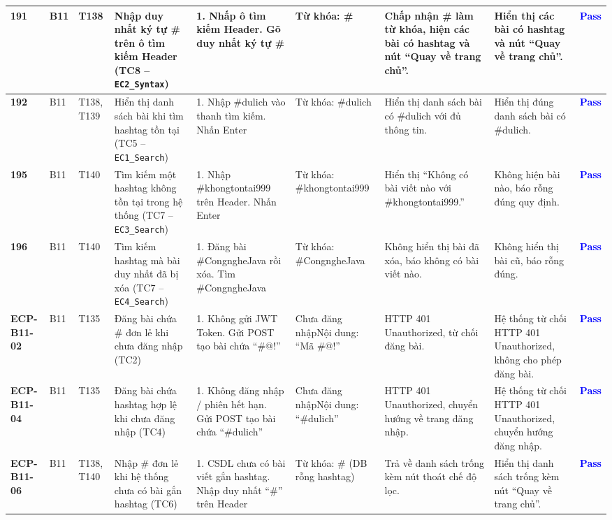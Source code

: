 \documentclass[11pt,a4paper]{article}
\begin{document}
\begin{longtable}{|C{0.9cm}|C{0.7cm}|C{0.9cm}|L{2.0cm}|L{3.0cm}|L{2.25cm}|L{2.6cm}|L{2.5cm}|C{0.85cm}|}
\textbf{191} & B11 & T138 & Nhập duy nhất ký tự \# trên ô tìm kiếm Header (TC8 -- \texttt{EC2\_Syntax}) & 1. Nhấp ô tìm kiếm Header. Gõ duy nhất ký tự \# & Từ khóa: \# & Chấp nhận \# làm từ khóa, hiện các bài có hashtag và nút ``Quay về trang chủ''. & Hiển thị các bài có hashtag và nút ``Quay về trang chủ''. & \textcolor{blue}{\textbf{Pass}} \\ \hline
\textbf{192} & B11 & T138, T139 & Hiển thị danh sách bài khi tìm hashtag tồn tại (TC5 -- \texttt{EC1\_Search}) & 1. Nhập \#dulich vào thanh tìm kiếm. Nhấn Enter & Từ khóa: \#dulich & Hiển thị danh sách bài có \#dulich với đủ thông tin. & Hiển thị đúng danh sách bài có \#dulich. & \textcolor{blue}{\textbf{Pass}} \\ \hline
\textbf{195} & B11 & T140 & Tìm kiếm một hashtag không tồn tại trong hệ thống (TC7 -- \texttt{EC3\_Search}) & 1. Nhập \#khongtontai999 trên Header. Nhấn Enter & Từ khóa: \#khongtontai999 & Hiển thị ``Không có bài viết nào với \#khongtontai999.'' & Không hiện bài nào, báo rỗng đúng quy định. & \textcolor{blue}{\textbf{Pass}} \\ \hline
\textbf{196} & B11 & T140 & Tìm kiếm hashtag mà bài duy nhất đã bị xóa (TC7 -- \texttt{EC4\_Search}) & 1. Đăng bài \#CongngheJava rồi xóa. Tìm \#CongngheJava & Từ khóa: \#CongngheJava & Không hiển thị bài đã xóa, báo không có bài viết nào. & Không hiển thị bài cũ, báo rỗng đúng. & \textcolor{blue}{\textbf{Pass}} \\ \hline
\textbf{ECP-B11-02} & B11 & T135 & Đăng bài chứa \# đơn lẻ khi chưa đăng nhập (TC2) & 1. Không gửi JWT Token. Gửi POST tạo bài chứa ``\#@!'' & Chưa đăng nhập\newline Nội dung: ``Mã \#@!'' & HTTP 401 Unauthorized, từ chối đăng bài. & Hệ thống từ chối HTTP 401 Unauthorized, không cho phép đăng bài. & \textcolor{blue}{\textbf{Pass}} \\ \hline
\textbf{ECP-B11-04} & B11 & T135 & Đăng bài chứa hashtag hợp lệ khi chưa đăng nhập (TC4) & 1. Không đăng nhập / phiên hết hạn. Gửi POST tạo bài chứa ``\#dulich'' & Chưa đăng nhập\newline Nội dung: ``\#dulich'' & HTTP 401 Unauthorized, chuyển hướng về trang đăng nhập. & Hệ thống từ chối HTTP 401 Unauthorized, chuyển hướng đăng nhập. & \textcolor{blue}{\textbf{Pass}} \\ \hline
\textbf{ECP-B11-06} & B11 & T138, T140 & Nhập \# đơn lẻ khi hệ thống chưa có bài gắn hashtag (TC6) & 1. CSDL chưa có bài viết gắn hashtag. Nhập duy nhất ``\#'' trên Header & Từ khóa: \# (DB rỗng hashtag) & Trả về danh sách trống kèm nút thoát chế độ lọc. & Hiển thị danh sách trống kèm nút ``Quay về trang chủ''. & \textcolor{blue}{\textbf{Pass}} \\ \hline
\end{longtable}
\endgroup
\end{document}
